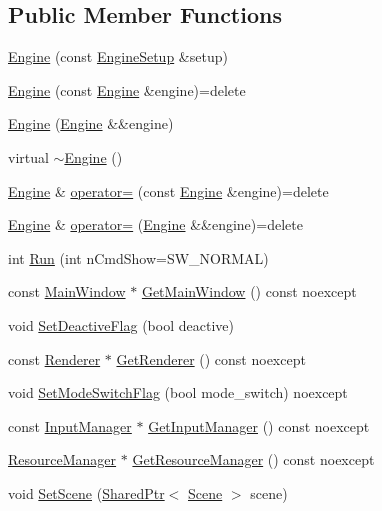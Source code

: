 \subsection*{Public Member Functions}
\begin{DoxyCompactItemize}
\item 
\hyperlink{classmage_1_1_engine_a99770cbb017b29c284d7f8e4c7e2b84c}{Engine} (const \hyperlink{structmage_1_1_engine_setup}{Engine\+Setup} \&setup)
\item 
\hyperlink{classmage_1_1_engine_afd2f4f32b2e803f59521aafe1924f0ba}{Engine} (const \hyperlink{classmage_1_1_engine}{Engine} \&engine)=delete
\item 
\hyperlink{classmage_1_1_engine_a69ee5a698bf54da107ebaa7839812840}{Engine} (\hyperlink{classmage_1_1_engine}{Engine} \&\&engine)
\item 
virtual \hyperlink{classmage_1_1_engine_a34628556f8397d70ed018d71e343c2f5}{$\sim$\+Engine} ()
\item 
\hyperlink{classmage_1_1_engine}{Engine} \& \hyperlink{classmage_1_1_engine_a1eedff82d4c8207c61676230520648fd}{operator=} (const \hyperlink{classmage_1_1_engine}{Engine} \&engine)=delete
\item 
\hyperlink{classmage_1_1_engine}{Engine} \& \hyperlink{classmage_1_1_engine_a22607a263e0be5e179cc0e4bf13b18f7}{operator=} (\hyperlink{classmage_1_1_engine}{Engine} \&\&engine)=delete
\item 
int \hyperlink{classmage_1_1_engine_acc09edf2a10338566926f6c6129c8746}{Run} (int n\+Cmd\+Show=S\+W\+\_\+\+N\+O\+R\+M\+AL)
\item 
const \hyperlink{classmage_1_1_main_window}{Main\+Window} $\ast$ \hyperlink{classmage_1_1_engine_ae12773fc604a46a3d94222ebcae2d593}{Get\+Main\+Window} () const noexcept
\item 
void \hyperlink{classmage_1_1_engine_a942bfa9892fa79bb1068d7c7ec4e6732}{Set\+Deactive\+Flag} (bool deactive)
\item 
const \hyperlink{classmage_1_1_renderer}{Renderer} $\ast$ \hyperlink{classmage_1_1_engine_a91f77d4f1914e1d63d405444a590615b}{Get\+Renderer} () const noexcept
\item 
void \hyperlink{classmage_1_1_engine_a5609c1700971f83bcf5b3259f7fea604}{Set\+Mode\+Switch\+Flag} (bool mode\+\_\+switch) noexcept
\item 
const \hyperlink{classmage_1_1_input_manager}{Input\+Manager} $\ast$ \hyperlink{classmage_1_1_engine_a9e8de859024c2b51d9b20ce498d6c07b}{Get\+Input\+Manager} () const noexcept
\item 
\hyperlink{classmage_1_1_resource_manager}{Resource\+Manager} $\ast$ \hyperlink{classmage_1_1_engine_a8b89ee555f5208a99872d724389eba0b}{Get\+Resource\+Manager} () const noexcept
\item 
void \hyperlink{classmage_1_1_engine_aec75ed67f8fb68a383fa892e50b21ea7}{Set\+Scene} (\hyperlink{namespacemage_a1e01ae66713838a7a67d30e44c67703e}{Shared\+Ptr}$<$ \hyperlink{classmage_1_1_scene}{Scene} $>$ scene)
\end{DoxyCompactItemize}
